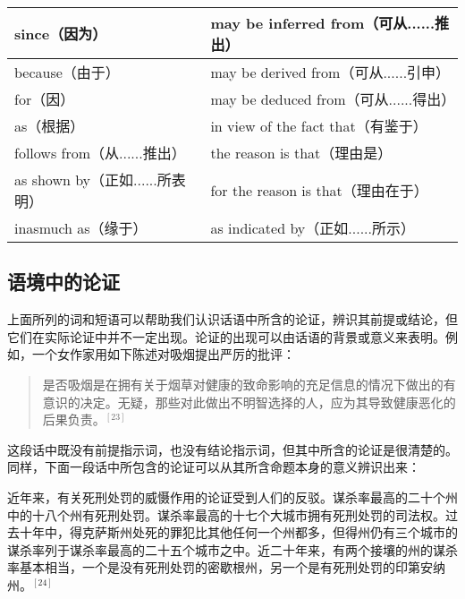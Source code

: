 \begin{center}
\begin{tabular}{|l|l|}
\hline
since（因为） & may be inferred from（可从......推出） \\
\hline
because（由于） & may be derived from（可从......引申） \\
\hline
for（因） & may be deduced from（可从......得出） \\
\hline
as（根据） & in view of the fact that（有鉴于） \\
\hline
follows from（从......推出） & the reason is that（理由是） \\
\hline
as shown by（正如......所表明） & for the reason is that（理由在于） \\
\hline
inasmuch as（缘于） & as indicated by（正如......所示） \\
\hline
\end{tabular}
\end{center}


\subsection{语境中的论证}

上面所列的词和短语可以帮助我们认识话语中所含的论证，辨识其前提或结论，但它们在实际论证中并不一定出现。论证的出现可以由话语的背景或意义来表明。例如，一个女作家用如下陈述对吸烟提出严厉的批评：

\begin{quotation}
是否吸烟是在拥有关于烟草对健康的致命影响的充足信息的情况下做出的有意识的决定。无疑，那些对此做出不明智选择的人，应为其导致健康恶化的后果负责。${}^{[23]}$
\end{quotation}

这段话中既没有前提指示词，也没有结论指示词，但其中所含的论证是很清楚的。同样，下面一段话中所包含的论证可以从其所含命题本身的意义辨识出来：

\begin{displayquote}
近年来，有关死刑处罚的威慑作用的论证受到人们的反驳。谋杀率最高的二十个州中的十八个州有死刑处罚。谋杀率最高的十七个大城市拥有死刑处罚的司法权。过去十年中，得克萨斯州处死的罪犯比其他任何一个州都多，但得州仍有三个城市的谋杀率列于谋杀率最高的二十五个城市之中。近二十年来，有两个接壤的州的谋杀率基本相当，一个是没有死刑处罚的密歇根州，另一个是有死刑处罚的印第安纳州。${}^{[24]}$
\end{displayquote}

